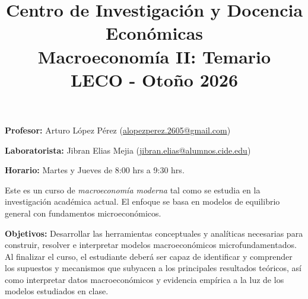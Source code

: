 \documentclass[12pt]{article}
\begin{document}
 
 
 
\title{
    \vspace{-1.5cm}
    \large \textbf{Centro de Investigación y Docencia Económicas}\\
    \textbf{Macroeconomía II: Temario}\\
    \textbf{LECO - Otoño 2026}
}

\date{}




\maketitle
{
\begin{flushleft}
\vspace{-1.5cm}
 \textbf{Profesor:} Arturo López Pérez (\href{mailto:alopezperez.2605@gmail.com}{alopezperez.2605@gmail.com})

 \vspace{.1cm}
 \textbf{Laboratorista:} Jibran Elias Mejia (\href{mailto:jibran.elias@alumnos.cide.edu}{jibran.elias@alumnos.cide.edu})

 \vspace{.1cm}
 \textbf{Horario:} Martes y Jueves de 8:00 hrs a 9:30 hrs.
\end{flushleft}
}




\noindent Este es un curso de \textit{macroeconomía moderna} tal como se estudia en la investigación académica actual. El enfoque se basa en modelos de equilibrio general con fundamentos microeconómicos.

\vspace{0.5cm}

\noindent \textbf{Objetivos:} Desarrollar las herramientas conceptuales y analíticas necesarias para construir, resolver e interpretar modelos macroeconómicos microfundamentados. Al finalizar el curso, el estudiante deberá ser capaz de identificar y comprender los supuestos y mecanismos que subyacen a los principales resultados teóricos, así como interpretar datos macroeconómicos y evidencia empírica a la luz de los modelos estudiados en clase.


\vspace{0.5cm}
\end{document}
